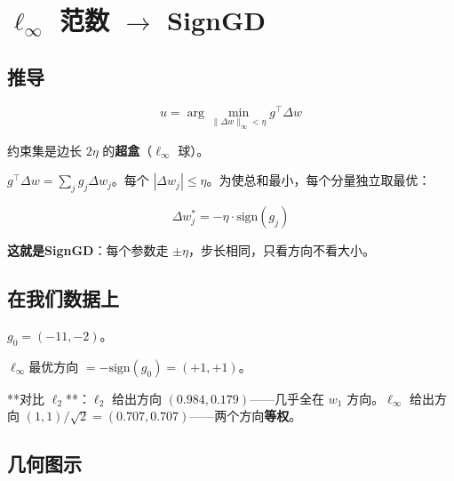 \documentclass[12pt,a4paper]{article}
\begin{document}
\section{$\ell_\infty$ 范数 $\to$ SignGD}


\subsection{推导}


\[u = \arg\min_{\|\Delta w\|_\infty < \eta} g^\top \Delta w\]

约束集是边长 $2\eta$ 的\textbf{超盒}（$\ell_\infty$ 球）。

$g^\top \Delta w = \sum_j g_j \Delta w_j$。每个 $|\Delta w_j| \le \eta$。为使总和最小，每个分量独立取最优：


\[\Delta w_j^* = -\eta \cdot \text{sign}(g_j)\]

\textbf{这就是SignGD}：每个参数走 $\pm\eta$，步长相同，只看方向不看大小。


\subsection{在我们数据上}

$g_0 = (-11, -2)$。

$\ell_\infty$最优方向 $= -\text{sign}(g_0) = (+1, +1)$。

**对比 $\ell_2$**：$\ell_2$ 给出方向 $(0.984, 0.179)$——几乎全在 $w_1$ 方向。$\ell_\infty$ 给出方向 $(1, 1)/\sqrt{2} = (0.707, 0.707)$——两个方向\textbf{等权}。


\subsection{几何图示}
\end{document}
